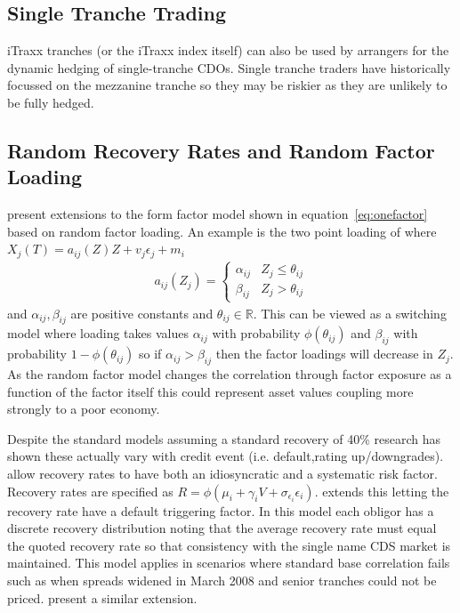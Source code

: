 \subsection{Single Tranche Trading}

iTraxx tranches (or the iTraxx index itself) can also be used by
arrangers for the dynamic hedging of single-tranche CDOs. Single tranche traders have historically focussed on the mezzanine tranche so they may be riskier as they are unlikely to be fully hedged.

\subsection{Random Recovery Rates and Random Factor Loading}

\cite{as2005,Neu2007} present extensions to the form factor model shown in equation~\eqref{eq:onefactor} based on random factor loading. An example is the two point loading of \cite{as2005} where $X_j(T) = a_{ij}(Z) Z + v_j \epsilon_j + m_i$ 
\begin{align}
a_{ij} \left(Z_j \right) =  \begin{cases} 
						\alpha_{ij} & Z_j \leq \theta_{ij} \nonumber\\
						\beta_{ij} & Z_j > \theta_{ij}  
					 \end{cases}
\end{align}
and $\alpha_{ij},\beta_{ij}$ are positive constants and $\theta_{ij} \in \mathbb{R} $.  This can be viewed as a switching model where loading takes values $\alpha_{ij}$ with probability $\phi(\theta_{ij})$ and  $\beta_{ij}$ with probability $1-\phi(\theta_{ij})$ so if $\alpha_{ij} > \beta_{ij}$ then the factor loadings will decrease in $Z_j$. As the random factor model changes the correlation through factor exposure as a function of the factor itself this could represent asset values coupling more strongly to a poor economy.

\medskip
Despite the standard models assuming a standard recovery of 40\% research has shown these actually vary with credit event (i.e. default,rating up/downgrades). \cite{as2005} allow recovery rates to have both an idiosyncratic and a systematic risk factor.  Recovery rates are specified as $R = \phi(\mu_i + \gamma_i V + \sigma_{\epsilon_i} \epsilon_i)$. \cite{kre2008} extends this letting the recovery rate have a default triggering factor. In this model each obligor has a discrete recovery distribution noting that the average recovery rate must equal the quoted recovery rate so that consistency with the single name CDS market is maintained.  This model applies in scenarios where standard base correlation fails such as when spreads widened in March 2008 and senior tranches could not be priced. \cite{AH2008} present a similar extension.



